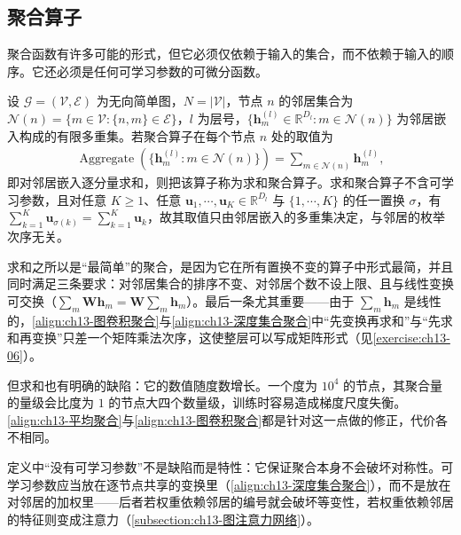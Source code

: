 \documentclass[../../main.tex]{subfiles}
\begin{document}
\subsection{聚合算子}\label{subsection:ch13-聚合算子}

聚合函数有许多可能的形式，但它必须仅依赖于输入的集合，而不依赖于输入的顺序。它还必须是任何可学习参数的可微分函数。

\begin{definition}[聚合算子]\label{definition:ch13-聚合算子}
设 $\mathcal{G}=(\mathcal{V},\mathcal{E})$ 为无向简单图，$N=|\mathcal{V}|$，节点 $n$ 的邻居集合为 $\mathcal{N}(n)=\{m\in\mathcal{V}:\{n,m\}\in\mathcal{E}\}$，$l$ 为层号，$\{\bm{h}_m^{(l)}\in\mathbb{R}^{D_l}:m\in\mathcal{N}(n)\}$ 为邻居嵌入构成的有限多重集。若聚合算子在每个节点 $n$ 处的取值为
\begin{align}
\operatorname{Aggregate}\!\left(\{\bm{h}_m^{(l)}:m\in\mathcal{N}(n)\}\right)=\sum_{m\in\mathcal{N}(n)}\bm{h}_m^{(l)},
\label{align:ch13-求和聚合}
\end{align}
即对邻居嵌入逐分量求和，则把该算子称为求和聚合算子。求和聚合算子不含可学习参数，且对任意 $K\geqslant1$、任意 $\bm{u}_1,\cdots,\bm{u}_K\in\mathbb{R}^{D_l}$ 与 $\{1,\cdots,K\}$ 的任一置换 $\sigma$，有 $\sum_{k=1}^{K}\bm{u}_{\sigma(k)}=\sum_{k=1}^{K}\bm{u}_k$，故其取值只由邻居嵌入的多重集决定，与邻居的枚举次序无关。
\end{definition}

\begin{remark}
求和之所以是“最简单”的聚合，是因为它在所有置换不变的算子中形式最简，并且同时满足三条要求：对邻居集合的排序不变、对邻居个数不设上限、且与线性变换可交换（$\sum_m\bm{W}\bm{h}_m=\bm{W}\sum_m\bm{h}_m$）。最后一条尤其重要——由于 $\sum_m\bm{h}_m$ 是线性的，\eqref{align:ch13-图卷积聚合}与\eqref{align:ch13-深度集合聚合}中“先变换再求和”与“先求和再变换”只差一个矩阵乘法次序，这使整层可以写成矩阵形式（见\cref{exercise:ch13-06}）。\par
但求和也有明确的缺陷：它的数值随度数增长。一个度为 $10^4$ 的节点，其聚合量的量级会比度为 $1$ 的节点大四个数量级，训练时容易造成梯度尺度失衡。\eqref{align:ch13-平均聚合}与\eqref{align:ch13-图卷积聚合}都是针对这一点做的修正，代价各不相同。\par
定义中“没有可学习参数”不是缺陷而是特性：它保证聚合本身不会破坏对称性。可学习参数应当放在逐节点共享的变换里（\eqref{align:ch13-深度集合聚合}），而不是放在对邻居的加权里——后者若权重依赖邻居的编号就会破坏等变性，若权重依赖邻居的特征则变成注意力（\cref{subsection:ch13-图注意力网络}）。
\end{remark}
\end{document}
